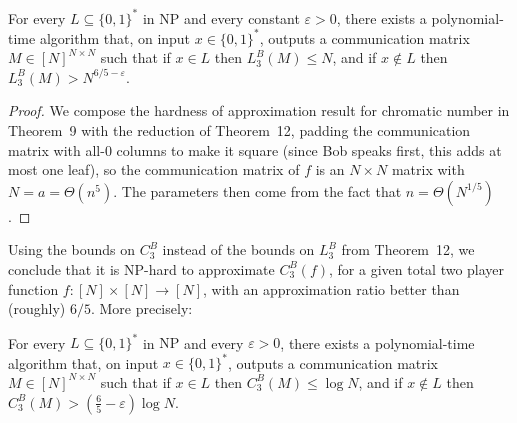 \begin{corollary}
For every $L\subseteq\{0,1\}^*$ in $\mathrm{NP}$ and every constant $\varepsilon>0$, there exists a polynomial-time algorithm that, on input $x\in\{0,1\}^*$, outputs a communication matrix $M\in[N]^{N\times N}$ such that if $x\in L$ then $L_3^B(M)\le N$, and if $x\notin L$ then $L_3^B(M)>N^{6/5-\varepsilon}$.
\end{corollary}
\begin{proof}
We compose the hardness of approximation result for chromatic number in Theorem~9 with the reduction of Theorem~12, padding the communication matrix with all-0 columns to make it square (since Bob speaks first, this adds at most one leaf), so the communication matrix of $f$ is an $N\times N$ matrix with $N=a=\Theta(n^5)$. The parameters then come from the fact that $n=\Theta(N^{1/5})$.
\end{proof}
Using the bounds on $C_3^B$ instead of the bounds on $L_3^B$ from Theorem~12, we conclude that it is NP-hard to approximate $C_3^B(f)$, for a given total two player function $f:[N]\times[N]\to[N]$, with an approximation ratio better than (roughly) $6/5$. More precisely:
\begin{corollary}
For every $L\subseteq\{0,1\}^*$ in $\mathrm{NP}$ and every $\varepsilon>0$, there exists a polynomial-time algorithm that, on input $x\in\{0,1\}^*$, outputs a communication matrix $M\in[N]^{N\times N}$ such that if $x\in L$ then $C_3^B(M)\le\log N$, and if $x\notin L$ then $C_3^B(M)>(\frac65-\varepsilon)\log N$.
\end{corollary}

